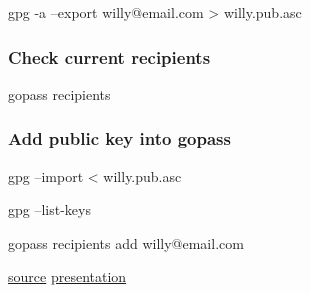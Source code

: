 \documentclass[9pt,english,a4paper,]{scrartcl}
\newenvironment{Shaded}{}{}
\newcommand{\ExtensionTok}[1]{#1}
\newcommand{\NormalTok}[1]{#1}
\newcommand{\OperatorTok}[1]{\textcolor[rgb]{0.40,0.40,0.40}{#1}}
\begin{document}
\begin{multicols}{3}
\begin{Shaded}
\begin{Highlighting}[]
\ExtensionTok{gpg}\NormalTok{ -a --export willy@email.com }\OperatorTok{>}\NormalTok{ willy.pub.asc}
\end{Highlighting}
\end{Shaded}

\hypertarget{check-current-recipients}{%
\subsubsection{Check current
recipients}\label{check-current-recipients}}

\begin{Shaded}
\begin{Highlighting}[]
\ExtensionTok{gopass}\NormalTok{ recipients}
\end{Highlighting}
\end{Shaded}

\hypertarget{add-public-key-into-gopass}{%
\subsubsection{Add public key into
gopass}\label{add-public-key-into-gopass}}

\begin{Shaded}
\begin{Highlighting}[]
\ExtensionTok{gpg}\NormalTok{ --import }\OperatorTok{<}\NormalTok{ willy.pub.asc}
\end{Highlighting}
\end{Shaded}

\begin{Shaded}
\begin{Highlighting}[]
\ExtensionTok{gpg}\NormalTok{ --list-keys}
\end{Highlighting}
\end{Shaded}

\begin{Shaded}
\begin{Highlighting}[]
\ExtensionTok{gopass}\NormalTok{ recipients add willy@email.com}
\end{Highlighting}
\end{Shaded}

\href{https://github.com/Woile/gopass-cheat-sheet}{source} \textbar{}
\href{https://woile.github.io/gopass-presentation/}{presentation}
\end{multicols}
\end{document}
